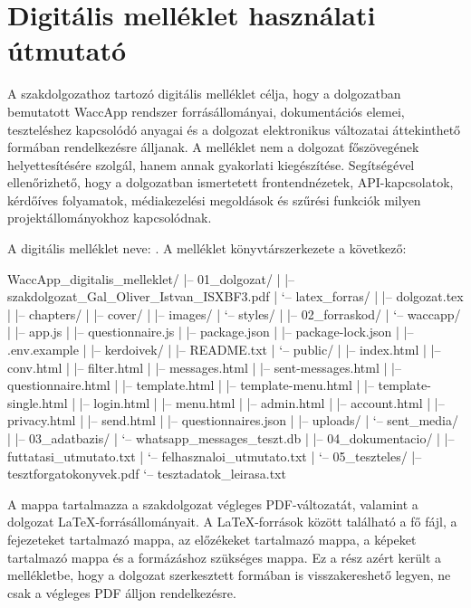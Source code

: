 \clearpage
\pagestyle{plain}
\chapter*{Digitális melléklet használati útmutató}

A szakdolgozathoz tartozó digitális melléklet célja, hogy a dolgozatban bemutatott WaccApp rendszer forrásállományai, dokumentációs elemei, teszteléshez kapcsolódó anyagai és a dolgozat elektronikus változatai áttekinthető formában rendelkezésre álljanak. A melléklet nem a dolgozat főszövegének helyettesítésére szolgál, hanem annak gyakorlati kiegészítése. Segítségével ellenőrizhető, hogy a dolgozatban ismertetett frontendnézetek, API-kapcsolatok, kérdőíves folyamatok, médiakezelési megoldások és szűrési funkciók milyen projektállományokhoz kapcsolódnak.

A digitális melléklet neve: . A melléklet könyvtárszerkezete a következő:

\begin{CodeBlock}
WaccApp_digitalis_melleklet/
|-- 01_dolgozat/
|   |-- szakdolgozat_Gal_Oliver_Istvan_ISXBF3.pdf
|   `-- latex_forras/
|       |-- dolgozat.tex
|       |-- chapters/
|       |-- cover/
|       |-- images/
|       `-- styles/
|
|-- 02_forraskod/
|   `-- waccapp/
|       |-- app.js
|       |-- questionnaire.js
|       |-- package.json
|       |-- package-lock.json
|       |-- .env.example
|       |-- kerdoivek/
|       |-- README.txt
|       `-- public/
|           |-- index.html
|           |-- conv.html
|           |-- filter.html
|           |-- messages.html
|           |-- sent-messages.html
|           |-- questionnaire.html
|           |-- template.html
|           |-- template-menu.html
|           |-- template-single.html
|           |-- login.html
|           |-- menu.html
|           |-- admin.html
|           |-- account.html
|           |-- privacy.html
|           |-- send.html
|           |-- questionnaires.json
|           |-- uploads/
|           `-- sent_media/
|
|-- 03_adatbazis/
|   `-- whatsapp_messages_teszt.db
|
|-- 04_dokumentacio/
|   |-- futtatasi_utmutato.txt
|   `-- felhasznaloi_utmutato.txt
|
`-- 05_teszteles/
    |-- tesztforgatokonyvek.pdf
    `-- tesztadatok_leirasa.txt
\end{CodeBlock}

A  mappa tartalmazza a szakdolgozat végleges PDF-változatát, valamint a dolgozat LaTeX-forrásállományait. A LaTeX-források között található a fő  fájl, a fejezeteket tartalmazó  mappa, az előzékeket tartalmazó  mappa, a képeket tartalmazó  mappa és a formázáshoz szükséges  mappa. Ez a rész azért került a mellékletbe, hogy a dolgozat szerkesztett formában is visszakereshető legyen, ne csak a végleges PDF álljon rendelkezésre.


